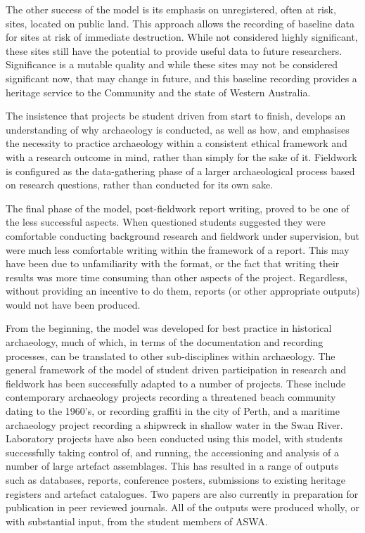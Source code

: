 \documentclass{ijsra}
\begin{document}
The other success of the model is its emphasis on unregistered, often at risk, sites, located on public land. This approach allows the recording of baseline data for sites at risk of immediate destruction. While not considered highly significant, these sites still have the potential to provide useful data to future researchers. 
Significance is a mutable quality \parencites{bowdler1984}{brown2008} and while these sites may not be considered significant now, that may change in future, and this baseline recording provides a heritage service to the Community and the state of Western Australia. 

The insistence that projects be student driven from start to finish, develops an understanding of why archaeology is conducted, as well as how, and emphasises the necessity to practice archaeology within a consistent ethical framework and with a research outcome in mind, rather than simply for the sake of it. 
Fieldwork is configured as the data-gathering phase of a larger archaeological process based on research questions, rather than conducted for its own sake. 

The final phase of the model, post-fieldwork report writing, proved to be one of the less successful aspects. When questioned students suggested they were comfortable conducting background research and fieldwork under supervision, but were much less comfortable writing within the framework of a report. 
This may have been due to unfamiliarity with the format, or the fact that writing their results was more time consuming than other aspects of the project. Regardless, without providing an incentive to do them, reports (or other appropriate outputs) would not have been produced.

From the beginning, the model was developed for best practice in historical archaeology, much of which, in terms of the documentation and recording processes, can be translated to other sub-disciplines within archaeology. 
The general framework of the model of student driven participation in research and fieldwork has been successfully adapted to a number of projects. These include contemporary archaeology projects recording a threatened beach community dating to the 1960's, or recording graffiti in the city of Perth, and a maritime archaeology project recording a shipwreck in shallow water in the Swan River. 
Laboratory projects have also been conducted using this model, with students successfully taking control of, and running, the accessioning and analysis of a number of large artefact assemblages. This has resulted in a range of outputs such as databases, reports, conference posters, submissions to existing heritage registers and artefact catalogues. 
Two papers are also currently in preparation for publication in peer reviewed journals. All of the outputs were produced wholly, or with substantial input, from the student members of ASWA.
\end{document}
